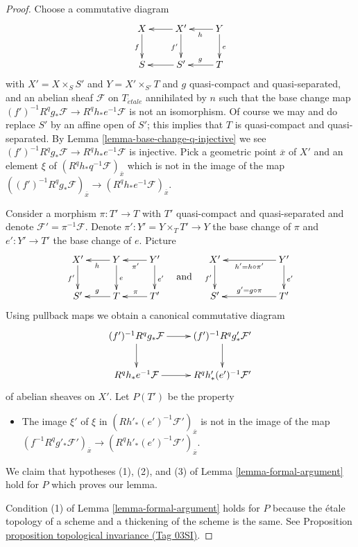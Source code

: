 \documentclass{amsart}
\theoremstyle{plain}
\theoremstyle{definition}
\theoremstyle{remark}
\numberwithin{equation}{subsection}
\def\etale{{\acute{e}tale}}
\begin{document}
\begin{proof}
Choose a commutative diagram
$$
\xymatrix{
X \ar[d]_f & X' \ar[l] \ar[d]_{f'} & Y \ar[l]^h \ar[d]^e \\
S & S' \ar[l] & T \ar[l]_g
}
$$
with $X' = X \times_S S'$ and $Y = X' \times_{S'} T$ and
$g$ quasi-compact and quasi-separated, and an abelian sheaf
$\mathcal{F}$ on $T_\etale$ annihilated by $n$ such that
the base change map
$(f')^{-1}R^qg_*\mathcal{F} \to R^qh_*e^{-1}\mathcal{F}$
is not an isomorphism. Of course we may and do replace $S'$
by an affine open of $S'$; this implies that $T$ is quasi-compact
and quasi-separated. By Lemma \ref{lemma-base-change-q-injective} we see
$(f')^{-1}R^qg_*\mathcal{F} \to R^qh_*e^{-1}\mathcal{F}$
is injective. Pick a geometric point $\overline{x}$ of $X'$
and an element $\xi$ of $(R^qh_*q^{-1}\mathcal{F})_{\overline{x}}$
which is not in the image of the map
$((f')^{-1}R^qg_*\mathcal{F})_{\overline{x}} \to
(R^qh_*e^{-1}\mathcal{F})_{\overline{x}}$.

\medskip\noindent
Consider a morphism $\pi : T' \to T$ with $T'$ quasi-compact
and quasi-separated and denote $\mathcal{F}' = \pi^{-1}\mathcal{F}$.
Denote $\pi' : Y' = Y \times_T T' \to Y$ the base change of $\pi$
and $e' : Y' \to T'$ the base change of $e$. Picture
$$
\vcenter{
\xymatrix{
X' \ar[d]_{f'} & Y \ar[l]^h \ar[d]^e & Y' \ar[l]^{\pi'} \ar[d]^{e'} \\
S' & T \ar[l]_g & T' \ar[l]_\pi
}
}
\quad\text{and}\quad
\vcenter{
\xymatrix{
X' \ar[d]_{f'} & & Y' \ar[ll]^{h' = h \circ \pi'} \ar[d]^{e'} \\
S' & & T' \ar[ll]_{g' = g \circ \pi}
}
}
$$
Using pullback maps we obtain a canonical commutative diagram
$$
\xymatrix{
(f')^{-1}R^qg_*\mathcal{F} \ar[r] \ar[d] &
(f')^{-1}R^qg'_*\mathcal{F}' \ar[d] \\
R^qh_*e^{-1}\mathcal{F} \ar[r] &
R^qh'_*(e')^{-1}\mathcal{F}'
}
$$
of abelian sheaves on $X'$. Let $P(T')$ be the property
\begin{itemize}
\item The image $\xi'$ of $\xi$ in
$(Rh'_*(e')^{-1}\mathcal{F}')_{\overline{x}}$ is
not in the image of the map
$(f^{-1}R^qg'_*\mathcal{F}')_{\overline{x}} \to
(R^qh'_*(e')^{-1}\mathcal{F}')_{\overline{x}}$.
\end{itemize}
We claim that hypotheses (1), (2), and (3) of
Lemma \ref{lemma-formal-argument} hold for $P$
which proves our lemma.

\medskip\noindent
Condition (1) of Lemma \ref{lemma-formal-argument}
holds for $P$ because the \'etale topology of a scheme
and a thickening of the scheme is the same. See
Proposition \href{https://stacks.math.columbia.edu/tag/03SI}{proposition topological invariance (Tag 03SI)}.


\end{proof}
\end{document}
